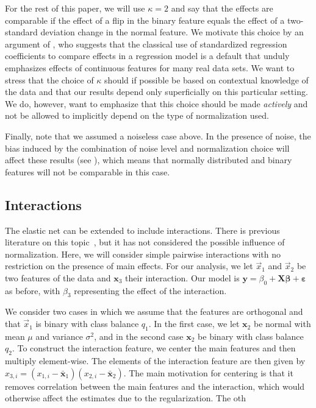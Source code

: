 For the rest of this paper, we will use \(\kappa = 2\) and say that the effects are
comparable if the effect of a flip in the binary feature equals the effect of a
two-standard deviation change in the normal feature. We motivate this choice by an argument
of \citet{gelman2008}, who suggests that the classical use of standardized regression
coefficients to compare effects in a regression model is a default that unduly emphasizes
effects of continuous features for many real data sets. We want to stress that the choice
of \(\kappa\) should if possible be based on contextual knowledge of the data and that our
results depend only superficially on this particular setting. We do, however, want to
emphasize that this choice should be made \emph{actively} and not be allowed to implicitly
depend on the type of normalization used.

Finally, note that we assumed a noiseless case above. In the presence of noise, the bias
induced by the combination of noise level and normalization choice will affect these
results (see ), which means that normally distributed and
binary features will not be comparable in this case.

\subsection{Interactions}\label{sec:interactions}

The elastic net can be extended to include interactions. There is previous literature on
this topic~\citep{bien2013,zemlianskaia2022,lim2015}, but it has not considered the
possible influence of normalization. Here, we will consider simple pairwise interactions
with no restriction on the presence of main effects. For our analysis, we let \(\vec{x}_1\)
and \(\vec{x}_2\) be two features of the data and \(\bm{x}_3\) their interaction. Our model
is \(\bm{y}=\beta_0 + \bm{X\beta} + \bm{\varepsilon}\) as before, with \(\beta_3\)
representing the effect of the interaction.

We consider two cases in which we assume that the features are orthogonal and that
\(\vec{x}_1\) is binary with class balance \(q_1\). In the first case, we let \(\bm{x}_2\)
be normal with mean \(\mu\) and variance \(\sigma^2\), and in the second case \(\bm{x}_2\)
be binary with class balance \(q_2\). To construct the interaction feature, we center the
main features and then multiply element-wise. The elements of the interaction feature are
then given by \(x_{3,i} = (x_{1,i} - \bar{\bm{x}}_1)(x_{2,i} - \bar{\bm{x}}_2)\). The main
motivation for centering is that it removes correlation between the main features and the
interaction, which would otherwise affect the estimates due to the regularization. The oth

